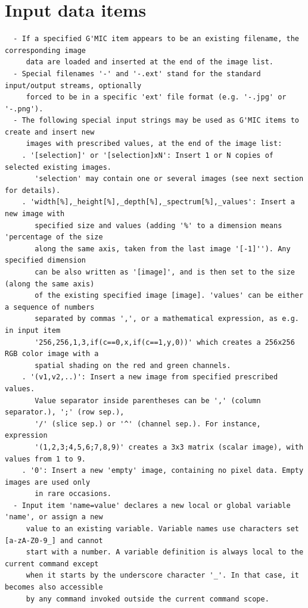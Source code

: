 \documentclass[a4paper,11pt,twoside]{book}
\begin{document}
\section{Input data items}
\small
\begin{lstlisting}
  - If a specified G'MIC item appears to be an existing filename, the corresponding image 
     data are loaded and inserted at the end of the image list. 
  - Special filenames '-' and '-.ext' stand for the standard input/output streams, optionally 
     forced to be in a specific 'ext' file format (e.g. '-.jpg' or '-.png'). 
  - The following special input strings may be used as G'MIC items to create and insert new 
     images with prescribed values, at the end of the image list: 
    . '[selection]' or '[selection]xN': Insert 1 or N copies of selected existing images. 
       'selection' may contain one or several images (see next section for details). 
    . 'width[%],_height[%],_depth[%],_spectrum[%],_values': Insert a new image with 
       specified size and values (adding '%' to a dimension means 'percentage of the size 
       along the same axis, taken from the last image '[-1]''). Any specified dimension 
       can be also written as '[image]', and is then set to the size (along the same axis) 
       of the existing specified image [image]. 'values' can be either a sequence of numbers 
       separated by commas ',', or a mathematical expression, as e.g. in input item 
       '256,256,1,3,if(c==0,x,if(c==1,y,0))' which creates a 256x256 RGB color image with a 
       spatial shading on the red and green channels. 
    . '(v1,v2,..)': Insert a new image from specified prescribed values. 
       Value separator inside parentheses can be ',' (column separator.), ';' (row sep.), 
       '/' (slice sep.) or '^' (channel sep.). For instance, expression 
       '(1,2,3;4,5,6;7,8,9)' creates a 3x3 matrix (scalar image), with values from 1 to 9. 
    . '0': Insert a new 'empty' image, containing no pixel data. Empty images are used only 
       in rare occasions. 
  - Input item 'name=value' declares a new local or global variable 'name', or assign a new 
     value to an existing variable. Variable names use characters set [a-zA-Z0-9_] and cannot 
     start with a number. A variable definition is always local to the current command except 
     when it starts by the underscore character '_'. In that case, it becomes also accessible 
     by any command invoked outside the current command scope.
\end{lstlisting}
\normalsize
\end{document}
